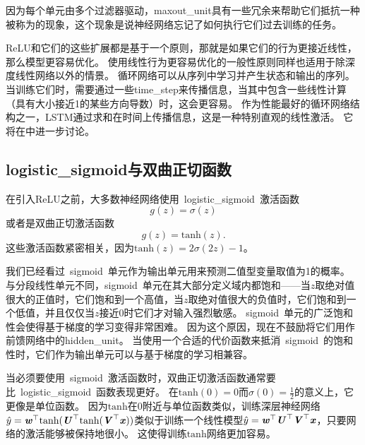 因为每个单元由多个过滤器驱动，\gls{maxout_unit}具有一些冗余来帮助它们抵抗一种被称为的现象，这个现象是说神经网络忘记了如何执行它们过去训练的任务\citep{Goodfellow+al-ICLR2014-small}。

\gls{ReLU}和它们的这些扩展都是基于一个原则，那就是如果它们的行为更接近线性，那么模型更容易优化。
使用线性行为更容易优化的一般性原则同样也适用于除深度线性网络以外的情景。
循环网络可以从序列中学习并产生状态和输出的序列。
当训练它们时，需要通过一些\gls{time_step}来传播信息，当其中包含一些线性计算（具有大小接近1的某些方向导数）时，这会更容易。
作为性能最好的循环网络结构之一，LSTM通过求和在时间上传播信息，这是一种特别直观的线性激活。
它将在中进一步讨论。


\subsection{\gls{logistic_sigmoid}与双曲正切函数}
\label{sec:logistic_sigmoid_and_hyperbolic_tangent}

在引入\gls{ReLU}之前，大多数神经网络使用~\gls{logistic_sigmoid}~激活函数
\begin{equation}
g(z) = \sigma(z)
\end{equation}
或者是双曲正切激活函数
\begin{equation}
g(z) = \text{tanh}(z).
\end{equation}
这些激活函数紧密相关，因为$\text{tanh}(z)=2\sigma(2z)-1$。

我们已经看过~\gls{sigmoid}~单元作为输出单元用来预测二值型变量取值为1的概率。
与分段线性单元不同，\gls{sigmoid}~单元在其大部分定义域内都饱和——当$z$取绝对值很大的正值时，它们饱和到一个高值，当$z$取绝对值很大的负值时，它们饱和到一个低值，并且仅仅当$z$接近0时它们才对输入强烈敏感。
\gls{sigmoid}~单元的广泛饱和性会使得基于梯度的学习变得非常困难。
因为这个原因，现在不鼓励将它们用作前馈网络中的\gls{hidden_unit}。
当使用一个合适的代价函数来抵消~\gls{sigmoid}~的饱和性时，它们作为输出单元可以与基于梯度的学习相兼容。

当必须要使用~\gls{sigmoid}~激活函数时，双曲正切激活函数通常要比~\gls{logistic_sigmoid}~函数表现更好。
在$\text{tanh}(0)=0$而$\sigma(0)=\frac{1}{2}$的意义上，它更像是单位函数。
因为$\text{tanh}$在0附近与单位函数类似，训练深层神经网络$\hat{y}=\boldsymbol{\mathit{w}}^\top \text{tanh}(\boldsymbol{\mathit{U}}^\top \text{tanh}(\boldsymbol{\mathit{V}}^\top \boldsymbol{\mathit{x}}))$类似于训练一个线性模型$\hat{y}= \boldsymbol{\mathit{w}}^\top \boldsymbol{\mathit{U}}^\top \boldsymbol{\mathit{V}}^\top \boldsymbol{\mathit{x}}$，只要网络的激活能够被保持地很小。
这使得训练$\text{tanh}$网络更加容易。

